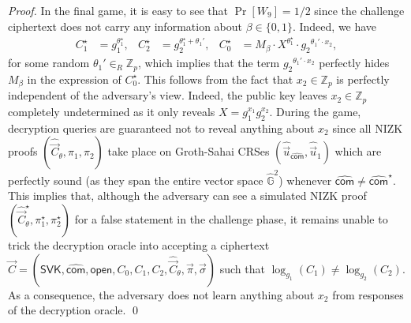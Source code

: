 \documentclass[10pt]{llncs}
\newcommand{\G}{\mathbb{G}}
\newcommand{\Z}{\mathbb{Z}}
\newcommand{\SVK}{\mathsf{SVK}}
\newcommand{\com}{\hat{\mathsf{com}}}
\newcommand{\open}{\mathsf{open}}
\begin{document}
\begin{proof}
  In the final game, it is easy to see that $\Pr[W_9]=1/2$ since the challenge ciphertext does not carry any information about $\beta \in \{0,1\}$. 
  Indeed, we have 
  \begin{align*}
    C_1^\star &= g_1^{\theta_1^\star}, & C_2^\star &= g_2^{\theta_1^\star + \theta_1'},    &  C_0^\star &= M_{\beta} \cdot X^{\theta_1^\star} 
                                                                                                          \cdot  {g_2}^{\theta_1' \cdot x_2} , 
  \end{align*} 
  for some random $\theta_1' \in_R \Z_p$, which implies that 		the term ${g_2}^{\theta_1' \cdot x_2}$ perfectly hides $M_\beta$ in the expression of $C_0^\star$. This follows from the fact
  that $x_2 \in \Z_p$ is perfectly independent of the adversary's view.	Indeed, the public key leaves $x_2 \in \Z_p$ completely undetermined as it only reveals $X=g_1^{x_1} g_2^{x_2}$. During the game, decryption queries are guaranteed not to reveal anything about $x_2$ since all 
  NIZK proofs $(\hat{\vec{C}}_{\theta},\pi_1,\pi_2)$ take place on   Groth-Sahai CRSes $(\hat{\vec{u}}_{\com},\hat{\vec{u}}_1)$ which are perfectly sound (as 
  they span the entire vector space $\hat{\G}^2$)
  whenever $\com \neq \com^\star$. This implies that, although the adversary can see a simulated NIZK proof $(\hat{\vec{C}}_\theta^\star,\pi_1^\star,\pi_2^\star)$ for 
  a false statement in the challenge phase, it remains  unable to trick the decryption oracle into accepting a  ciphertext 
  $ \vec{C} = (\SVK, \com, \open, C_0, C_1, C_2, \hat{\vec{C}}_{\theta}, \vec{\pi}, \vec{\sigma})  $ such that $\log_{g_1}(C_1) \neq \log_{g_2}(C_2)$. 
  As a consequence, the adversary does not learn anything about $x_2$ from responses of the decryption oracle. 
  \qed
\end{proof}
\end{document}
